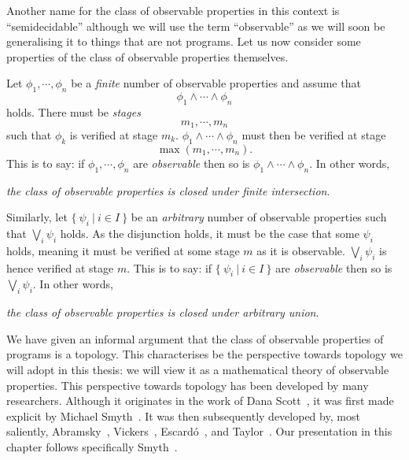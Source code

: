 Another name for the class of observable properties in this context is ``semidecidable''
although we will use the term ``observable'' as we will soon be generalising it to things
that are not programs. Let us now consider some properties of the class of observable
properties themselves.

Let $\phi_1, \cdots ,\phi_n$ be a \emph{finite} number of observable properties and assume that
\begin{equation*}
  \phi_1 \wedge \cdots \wedge \phi_n
\end{equation*}
holds. There must be \emph{stages}
\begin{equation*}
  m_1, \cdots , m_n
\end{equation*}
such that $\phi_k$ is verified at stage $m_k$. $\phi_1 \wedge \cdots \wedge \phi_n$ must then be verified at stage
\begin{equation*}
  \max(m_1, \cdots, m_n).
\end{equation*}
This is to say: if $\phi_1, \cdots, \phi_n$ are \emph{observable} then so is
$\phi_1 \wedge \cdots \wedge \phi_n$. In other words,
\begin{center}
  \emph{the class of observable properties is closed under finite intersection}.
\end{center}

Similarly, let $\{~\psi_i ~|~ i \in I~\}$ be an \emph{arbitrary} number of observable
properties such that $\bigvee_i \psi_i$ holds. As the disjunction holds, it must be the case that
some $\psi_i$ holds, meaning it must be verified at some stage $m$ as it is observable. $\bigvee_i
\psi_i$ is hence verified at stage $m$. This is to say: if $\{~\psi_i ~|~ i \in I~\}$ are
\emph{observable} then so is $\bigvee_i \psi_i$. In other words,
\begin{center}
  \emph{the class of observable properties is closed under arbitrary union}.
\end{center}

We have given an informal argument that the class of observable properties of programs is
a topology. This characterises be the perspective towards topology we will adopt in this
thesis: we will view it as a mathematical theory of observable properties. This
perspective towards topology has been developed by many researchers. Although it
originates in the work of Dana Scott~\cite{scott-original}, it was first made explicit by
Michael Smyth~\cite{smyth-handbook}. It was then subsequently developed by,
most saliently,
  Abramsky~\cite{abramsky-thesis},
  Vickers~\cite{vickers},
  Escardó~\cite{synthetic-topology}, and
  Taylor~\cite{taylor-asd}.
Our presentation in this chapter follows specifically Smyth~\cite{smyth-hanbook}.

